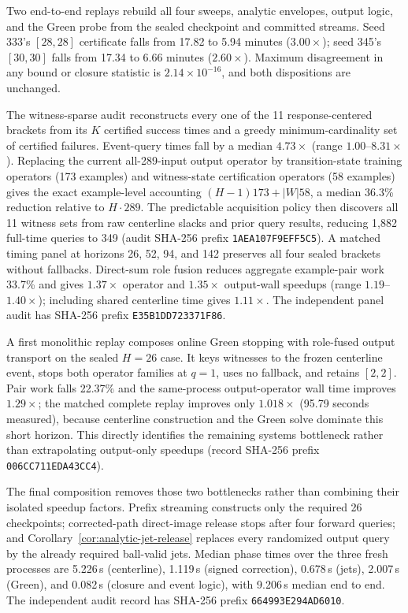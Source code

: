 \documentclass{article}
\begin{document}
Two end-to-end replays rebuild all four sweeps, analytic envelopes, output
logic, and the Green probe from the sealed checkpoint and committed streams.
Seed 333's $[28,28]$ certificate falls from 17.82 to 5.94 minutes
($3.00\times$); seed 345's $[30,30]$ falls from 17.34 to 6.66 minutes
($2.60\times$).  Maximum disagreement in any bound or closure statistic is
$2.14\times10^{-16}$, and both dispositions are unchanged.

The witness-sparse audit reconstructs every one of the 11 response-centered
brackets from its $K$ certified success times and a greedy minimum-cardinality
set of certified failures.  Event-query times fall by a median
$4.73\times$ (range $1.00$--$8.31\times$).  Replacing the current all-289-input
output operator by transition-state training operators (173 examples) and
witness-state certification operators (58 examples) gives the exact
example-level accounting
\((H-1)173+|W|58\), a median 36.3\% reduction relative to \(H\cdot289\).
The predictable acquisition policy then discovers all 11 witness sets from
raw centerline slacks and prior query results, reducing 1,882 full-time queries
to 349 (audit SHA-256 prefix \texttt{1AEA107F9EFF5C5}).  A matched timing panel
at horizons 26, 52, 94, and 142 preserves all four sealed brackets without
fallbacks.  Direct-sum role fusion reduces aggregate example-pair work 33.7\%
and gives $1.37\times$ operator and $1.35\times$ output-wall speedups (range
$1.19$--$1.40\times$); including shared centerline time gives $1.11\times$.
The independent panel audit has SHA-256 prefix
\texttt{E35B1DD723371F86}.

A first monolithic replay composes online Green stopping with role-fused output
transport on the sealed $H=26$ case.  It keys witnesses to the frozen
centerline event, stops both operator families at $q=1$, uses no fallback, and
retains $[2,2]$.  Pair work falls 22.37\% and the same-process output-operator
wall time improves $1.29\times$; the matched complete replay improves only
$1.018\times$ (95.79 seconds measured), because centerline construction and
the Green solve dominate this short horizon.  This directly identifies the
remaining systems bottleneck rather than extrapolating output-only speedups
(record SHA-256 prefix \texttt{006CC711EDA43CC4}).

The final composition removes those two bottlenecks rather than combining
their isolated speedup factors.  Prefix streaming constructs only the required
26 checkpoints; corrected-path direct-image release stops after four forward
queries; and Corollary~\ref{cor:analytic-jet-release} replaces every randomized
output query by the already required ball-valid jets.  Median phase times over
the three fresh processes are 5.226\,s (centerline), 1.119\,s (signed correction),
0.678\,s (jets), 2.007\,s (Green), and 0.082\,s (closure and event logic), with
9.206\,s median end to end.  The independent audit record has SHA-256 prefix
\texttt{664993E294AD6010}.
\end{document}

